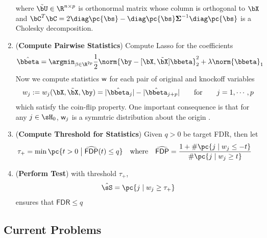 \documentclass[11pt]{article}
\begin{document}
\begin{enumerate}
    where $\tilde{\bU}\in\R^{n\times p}$ is orthonormal matrix whose column is orthogonal to $\bX$ and $\bC^T\bC = 2\diag\pc{\bs} - \diag\pc{\bs}\bSigma^{-1}\diag\pc{\bs}$ is a Cholesky decomposition.
    \item (\textbf{Compute Pairwise Statistics}) Compute Lasso for the coefficients
    \begin{align*}
        \hat{\bbeta}
            = \argmin_{\beta\in\R^{2p}}
                \frac{1}{2} \norm{\by - [\bX,\tilde{\bX}]\bbeta}_2^2 + \lambda \norm{\bbeta}_1
    \end{align*}
    Now we compute statistics $\mathsf{w}$ for each pair of original and knockoff variables
    \begin{align*}
        w_j
            := w_j(\bX,\tilde{\bX},\by)
            = |\hat{\bbeta}_j| - |\hat{\bbeta}_{j+p}|
        \quad\quad\text{for}\quad\quad
            j = 1,\cdots,p
    \end{align*}
    which satisfy the coin-flip property. One important consequence is that for any $j\in\sH_0$, $\mathsf{w}_j$ is a symmtric distribution about the origin \cite{barberControllingFalseDiscovery2015,candesPanningGoldModelX2017}.
    \item (\textbf{Compute Threshold for Statistics}) Given $q>0$ be target FDR, then let 
    \begin{align*}
        \tau_+
            &= \min\pc{t>0 \;\big|\; \widehat{\textsf{FDP}}(t) \leq q }
            \quad\text{where}\quad
            \widehat{\textsf{FDP}} = \frac{1 + \# \pc{ j \mid w_j \leq -t }}{\#\pc{j \mid w_j \geq t}} 
    \end{align*}
    \item (\textbf{Perform Test}) with threshold $\tau_+$,
    \begin{align*}
        \hat{\sS} = 
            \pc{j \mid w_j \geq \tau_+}
    \end{align*}
    ensures that $\textsf{FDR}\leq q$
\end{enumerate} 

\subsection{Current Problems}
\end{document}
